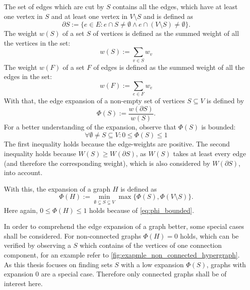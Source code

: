 The set of edges which are cut by $S$ contains all the edges, which have at least one vertex in $S$ and at least one vertex in $V\setminus S$ and is defined as \begin{equation}
\partial S:= \{e\in E : e \cap S \neq \emptyset \land  e \cap (V \setminus S) \neq \emptyset  \}.
\end{equation} 
The weight $w(S)$ of a set $S$ of vertices is defined as the summed weight of all the vertices in the set: 
\begin{equation}
	w(S) := \sum_{v\in S} w_v
\end{equation}
The weight $w(F)$ of a set $F$ of edges is defined as the summed weight of all the edges in the set: 
\begin{equation}
w(F) := \sum_{e\in F} w_e
\end{equation}
With that, the edge expansion of a non-empty set of vertices $S \subseteq V$ is defined by \begin{equation}
\Phi(S):= \frac{w(\partial S)}{w(S)}.
\end{equation}
For a better understanding of the expansion, observe that $\Phi(S)$ is bounded: \begin{equation} \label{eq:phi_bounded}
\forall \emptyset \neq S \subseteq V : 0\le \Phi(S) \le 1 
\end{equation} The first inequality holds because the edge-weights are positive. The second inequality holds because $W(S) \ge W(\partial S)$, as $W(S)$ takes at least every edge (and therefore the corresponding weight), which is also considered by $W(\partial S)$, into account.


With this, the expansion of a graph $H$ is defined as \begin{equation}
\Phi(H) := \min_{\emptyset \subsetneq S \subsetneq V} \max \{\Phi(S), \Phi(V\setminus S)\}.
\end{equation} Here again, $0\le \Phi(H)\le 1$ holds because of \cref{eq:phi_bounded}.

In order to comprehend the edge expansion of a graph better, some special cases shall be considered.
For non-connected graphs $\Phi(H) = 0$ holds, which can be verified by observing a $S$ which contains of the vertices of one connection component, for an example refer to \cref{fig:exapmle_non_connected_hypergraph}. As this thesis focuses on finding sets $S$ with a low expansion $\Phi(S)$, graphs with expansion $0$ are a special case. Therefore only connected graphs shall be of interest here.

